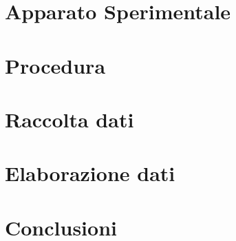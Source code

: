 \documentclass{article}
\begin{document}
\tableofcontents

\newpage
\begin{abstract}

\end{abstract}

\newpage
\section{Apparato Sperimentale}

\newpage
\section{Procedura}

\newpage
\section{Raccolta dati}

\newpage
\section{Elaborazione dati}

\newpage
\section{Conclusioni}
\end{document}
